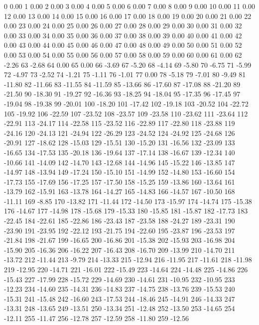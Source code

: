 0 0.00
1 0.00
2 0.00
3 0.00
4 0.00
5 0.00
6 0.00
7 0.00
8 0.00
9 0.00
10 0.00
11 0.00
12 0.00
13 0.00
14 0.00
15 0.00
16 0.00
17 0.00
18 0.00
19 0.00
20 0.00
21 0.00
22 0.00
23 0.00
24 0.00
25 0.00
26 0.00
27 0.00
28 0.00
29 0.00
30 0.00
31 0.00
32 0.00
33 0.00
34 0.00
35 0.00
36 0.00
37 0.00
38 0.00
39 0.00
40 0.00
41 0.00
42 0.00
43 0.00
44 0.00
45 0.00
46 0.00
47 0.00
48 0.00
49 0.00
50 0.00
51 0.00
52 0.00
53 0.00
54 0.00
55 0.00
56 0.00
57 0.00
58 0.00
59 0.00
60 0.00
61 0.00
62 -2.26
63 -2.68
64 0.00
65 0.00
66 -3.69
67 -5.20
68 -4.14
69 -5.80
70 -6.75
71 -5.99
72 -4.97
73 -2.52
74 -1.21
75 -1.11
76 -1.01
77 0.00
78 -5.18
79 -7.01
80 -9.49
81 -11.80
82 -11.66
83 -11.55
84 -11.59
85 -13.66
86 -17.60
87 -17.08
88 -21.20
89 -21.50
90 -18.30
91 -19.27
92 -16.36
93 -18.25
94 -18.04
95 -17.35
96 -17.45
97 -19.04
98 -19.38
99 -20.01
100 -18.20
101 -17.42
102 -19.18
103 -20.52
104 -22.72
105 -19.92
106 -22.59
107 -23.52
108 -23.57
109 -23.58
110 -23.62
111 -23.64
112 -22.91
113 -24.17
114 -22.58
115 -23.52
116 -22.89
117 -22.80
118 -23.88
119 -24.16
120 -24.13
121 -24.94
122 -26.29
123 -24.52
124 -24.92
125 -24.68
126 -20.91
127 -18.62
128 -15.03
129 -15.51
130 -15.20
131 -16.56
132 -23.09
133 -16.65
134 -17.53
135 -20.18
136 -19.64
137 -17.14
138 -16.67
139 -12.34
140 -10.66
141 -14.09
142 -14.70
143 -12.68
144 -14.96
145 -15.22
146 -13.85
147 -14.97
148 -13.94
149 -17.24
150 -15.10
151 -14.99
152 -14.80
153 -16.60
154 -17.73
155 -17.69
156 -17.25
157 -17.50
158 -15.25
159 -13.86
160 -13.64
161 -13.79
162 -15.91
163 -13.78
164 -14.27
165 -14.83
166 -14.57
167 -10.50
168 -11.11
169 -8.85
170 -13.82
171 -11.44
172 -14.50
173 -15.97
174 -14.74
175 -15.38
176 -14.67
177 -14.98
178 -15.68
179 -15.33
180 -15.85
181 -15.87
182 -17.73
183 -22.45
184 -22.61
185 -22.86
186 -23.43
187 -23.58
188 -24.27
189 -23.31
190 -23.90
191 -23.95
192 -22.12
193 -21.75
194 -22.60
195 -23.87
196 -23.53
197 -21.84
198 -21.67
199 -16.65
200 -16.86
201 -15.38
202 -15.93
203 -16.98
204 -15.90
205 -16.36
206 -16.22
207 -16.43
208 -16.70
209 -13.99
210 -14.70
211 -13.72
212 -11.44
213 -9.79
214 -13.33
215 -12.94
216 -11.95
217 -11.61
218 -11.98
219 -12.95
220 -14.71
221 -16.01
222 -15.49
223 -14.64
224 -14.48
225 -14.86
226 -15.43
227 -17.99
228 -15.72
229 -14.69
230 -14.61
231 -10.95
232 -10.95
233 -12.23
234 -14.60
235 -14.31
236 -14.83
237 -14.75
238 -13.76
239 -15.53
240 -15.31
241 -15.48
242 -16.60
243 -17.53
244 -18.46
245 -14.91
246 -14.33
247 -13.31
248 -13.65
249 -13.51
250 -13.34
251 -12.48
252 -13.50
253 -14.65
254 -12.11
255 -11.47
256 -12.78
257 -12.59
258 -11.80
259 -12.56
